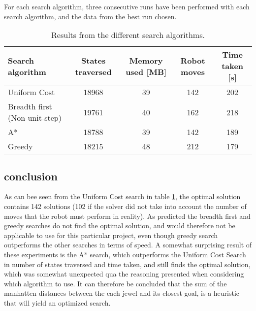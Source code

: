 For each search algorithm, three consecutive runs have been performed with each search algorithm, and the data from the best run chosen.\\

\begin{table}[h!]
	\centering
	\begin{tabular}{| l | c | c | c | c | }
		\hline
			Search algorithm	& States traversed & Memory used [MB] & Robot moves & Time taken [s]\\ \hline
	    	Uniform Cost & 18968 			& 39 		 & 142 	& 202\\\hline
		    Breadth first (Non unit-step)	& 19761 			& 40 		 & 162 	& 218\\\hline
		    A*		& 18788 			& 39 		 & 142 	& 189 \\\hline
	    	Greedy 		& 18215 			& 48 		 & 212 	& 179 \\
		\hline
	\end{tabular}
	\label{tbl:searchresults}
	\caption{Results from the different search algorithms.}
\end{table}

\subsection{conclusion}
As can bee seen from the Uniform Cost search in table \ref{tbl:searchresults}, the optimal solution contains 142 solutions (102 if the solver did not take into account the number of moves that the robot must perform in reality). As predicted the breadth first and greedy searches do not find the optimal solution, and would therefore not be applicable to use for this particular project, even though greedy search outperforms the other searches in terms of speed. A somewhat surprising result of these experiments is the A* search, which outperforms the Uniform Cost Search in number of states traversed and time taken, and still finds the optimal solution, which was somewhat unexpected qua the reasoning presented when considering which algorithm to use. It can therefore be concluded that the sum of the manhatten distances between the each jewel and its closest goal, is a heuristic that will yield an optimized search.
